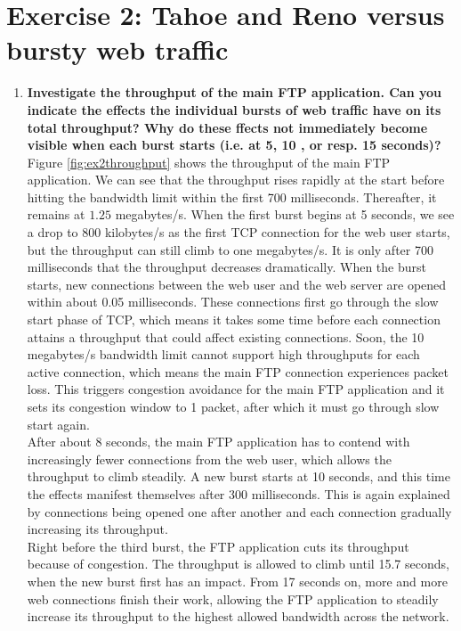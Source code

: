 \documentclass[a4paper,10pt]{article}
\begin{document}
\section{Exercise 2: Tahoe and Reno versus bursty web traffic}
\begin{enumerate}
 \item \textbf{Investigate the throughput of the main FTP application. Can you indicate the effects the
 individual bursts of web traffic have on its total throughput? Why do these ffects not immediately
 become visible when each burst starts (i.e. at 5, 10 , or resp. 15 seconds)?} \\
 
 Figure \ref{fig:ex2throughput} shows the throughput of the main FTP application. We can see that the throughput rises
 rapidly at the start before hitting the bandwidth limit within the first 700 milliseconds. Thereafter, it remains at $1.25$
 megabytes/s. When the first burst begins at 5 seconds, we see a drop to 800 kilobytes/s as the first TCP connection for the web user
 starts, but the throughput can still climb to one megabytes/s. It is only after 700 milliseconds that the throughput
 decreases dramatically. When the burst starts, new connections between the web user and the web server are opened within
 about 0.05 milliseconds. These connections first go through the slow start phase of TCP, which means it takes some time
 before each connection attains a throughput that could affect existing connections. Soon, the 10 megabytes/s bandwidth
 limit cannot support high throughputs for each active connection, which means the main FTP connection experiences packet loss. This triggers
 congestion avoidance for the main FTP application and it sets its congestion window to 1 packet, after which it
 must go through slow start again. \\
 
 After about 8 seconds, the main FTP application has to contend with increasingly fewer connections from the web user,
 which allows the throughput to climb steadily. A new burst starts at 10 seconds, and this time the effects manifest
 themselves after 300 milliseconds. This is again explained by connections being opened one after another and
 each connection gradually increasing its throughput. \\
 
 Right before the third burst, the FTP application cuts its throughput because of congestion. The throughput is allowed
 to climb until 15.7 seconds, when the new burst first has an impact. From 17 seconds on, more and more web connections
 finish their work, allowing the FTP application to steadily increase its throughput to the highest allowed bandwidth
 across the network.
 

\end{enumerate}
\end{document}
